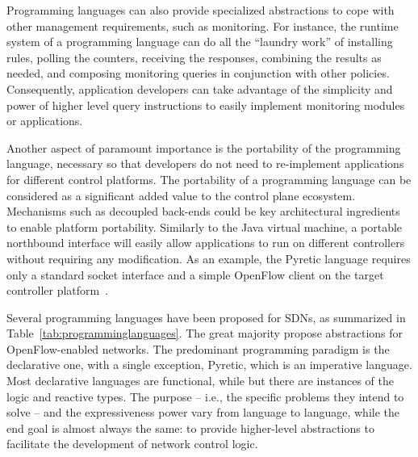 Programming languages can also provide specialized abstractions to cope with other management requirements, 
such as monitoring.
For instance, the runtime system of a programming language can do all the ``laundry work'' of installing rules, polling 
the counters, receiving the responses, combining the results as needed, and composing monitoring queries in 
conjunction with other policies. Consequently, application developers can take advantage of the simplicity and 
power of higher level query instructions to easily implement monitoring modules or applications.

Another aspect of paramount importance is the portability of the programming language, necessary so that developers do not 
need to re-implement applications for different control platforms.
The portability of a programming language can be considered as a significant added value to the control plane ecosystem. 
Mechanisms such as decoupled back-ends could be key architectural ingredients to enable platform portability.
Similarly to the Java virtual machine, a portable northbound interface will easily allow applications to run on different controllers without requiring any modification.
As an example, the Pyretic language requires only a standard socket interface and a simple OpenFlow client on the target controller 
platform~\cite{monsanto2013}.

Several programming languages have been proposed for SDNs, as summarized in Table~\ref{tab:programminglanguages}.
The great majority propose abstractions for OpenFlow-enabled networks.
The predominant programming paradigm is the declarative one, with a single exception, Pyretic, which is an imperative language. 
Most declarative languages are functional, while but there are instances of the logic and reactive types.
The purpose -- i.e., the specific problems they intend to solve -- and the expressiveness power vary from language to 
language, while the end goal is almost always the same: to provide higher-level abstractions to facilitate the 
development of network control logic.

